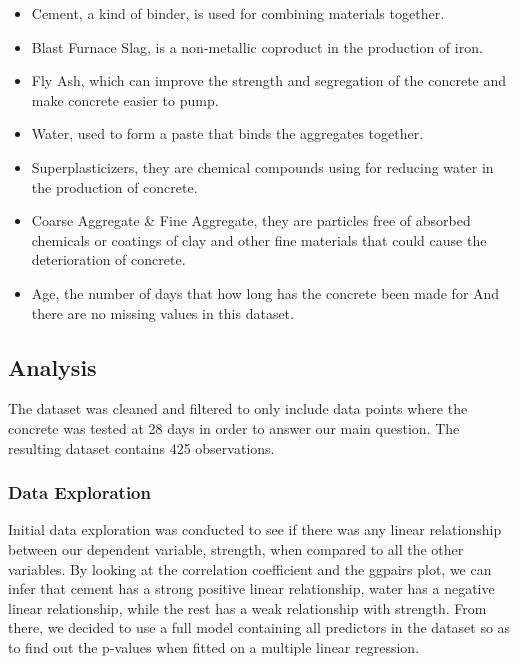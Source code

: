 \documentclass[letterpaper,9pt,twocolumn,twoside,]{pinp}
\providecommand{\tightlist}{%
  \setlength{\itemsep}{0pt}\setlength{\parskip}{0pt}}
\begin{document}
\begin{itemize}
\tightlist
\item
  Cement, a kind of binder, is used for combining materials together.
\item
  Blast Furnace Slag, is a non-metallic coproduct in the production of
  iron.
\item
  Fly Ash, which can improve the strength and segregation of the
  concrete and make concrete easier to pump.
\item
  Water, used to form a paste that binds the aggregates together.
\item
  Superplasticizers, they are chemical compounds using for reducing
  water in the production of concrete.
\item
  Coarse Aggregate \& Fine Aggregate, they are particles free of
  absorbed chemicals or coatings of clay and other fine materials that
  could cause the deterioration of concrete.
\item
  Age, the number of days that how long has the concrete been made for
  And there are no missing values in this dataset.
\end{itemize}

\hypertarget{analysis}{%
\subsection{Analysis}\label{analysis}}

The dataset was cleaned and filtered to only include data points where
the concrete was tested at 28 days in order to answer our main question.
The resulting dataset contains 425 observations.

\hypertarget{data-exploration}{%
\subsubsection{Data Exploration}\label{data-exploration}}

Initial data exploration was conducted to see if there was any linear
relationship between our dependent variable, strength, when compared to
all the other variables. By looking at the correlation coefficient and
the ggpairs plot, we can infer that cement has a strong positive linear
relationship, water has a negative linear relationship, while the rest
has a weak relationship with strength. From there, we decided to use a
full model containing all predictors in the dataset so as to find out
the p-values when fitted on a multiple linear regression.
\end{document}
